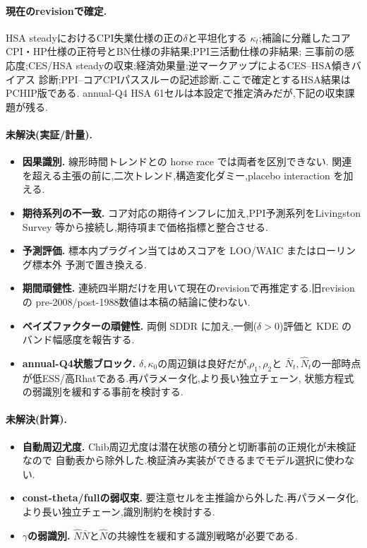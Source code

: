 \documentclass[11pt]{article}
\newcommand{\kt}{\kappa_t}
\begin{document}
\paragraph{現在のrevisionで確定.} HSA steadyにおけるCPI失業仕様の正の$\delta$と平坦化する
$\kt$;補論に分離したコアCPI・HP仕様の正符号とBN仕様の非結果;PPI三活動仕様の非結果;
三事前の感応度;CES/HSA steadyの収束;経済効果量;逆マークアップによるCES--HSA傾きバイアス
診断;PPI--コアCPIパススルーの記述診断.ここで確定とするHSA結果はPCHIP版である.
annual-Q4 HSA 61セルは本設定で推定済みだが,下記の収束課題が残る.

\paragraph{未解決(実証/計量).}
\begin{itemize}
\item \textbf{因果識別.} 線形時間トレンドとの horse race では両者を区別できない.
関連を超える主張の前に,二次トレンド,構造変化ダミー,placebo interaction を加える.
\item \textbf{期待系列の不一致.} コア対応の期待インフレに加え,PPI予測系列をLivingston Survey
等から接続し,期待項まで価格指標と整合させる.
\item \textbf{予測評価.} 標本内プラグイン当てはめスコアを LOO/WAIC またはローリング標本外
予測で置き換える.
\item \textbf{期間頑健性.} 連続四半期だけを用いて現在のrevisionで再推定する.旧revisionの
pre-2008/post-1988数値は本稿の結論に使わない.
\item \textbf{ベイズファクターの頑健性.} 両側 SDDR に加え,一側($\delta>0$)評価と KDE の
バンド幅感度を報告する.
\item \textbf{annual-Q4状態ブロック.} $\delta,\kappa_0$の周辺鎖は良好だが,$\rho_1,\rho_2$と
$\bar N_t,\hat N_t$の一部時点が低ESS/高Rhatである.再パラメータ化,より長い独立チェーン,
状態方程式の弱識別を緩和する事前を検討する.
\end{itemize}

\paragraph{未解決(計算).}
\begin{itemize}
\item \textbf{自動周辺尤度.} Chib周辺尤度は潜在状態の積分と切断事前の正規化が未検証なので
自動表から除外した.検証済み実装ができるまでモデル選択に使わない.
\item \textbf{const-theta/fullの弱収束.} 要注意セルを主推論から外した.再パラメータ化,
より長い独立チェーン,識別制約を検討する.
\item \textbf{$\gamma$の弱識別.} $\hat N\bar N$と$\hat N$の共線性を緩和する識別戦略が必要である.
\end{itemize}
\end{document}
